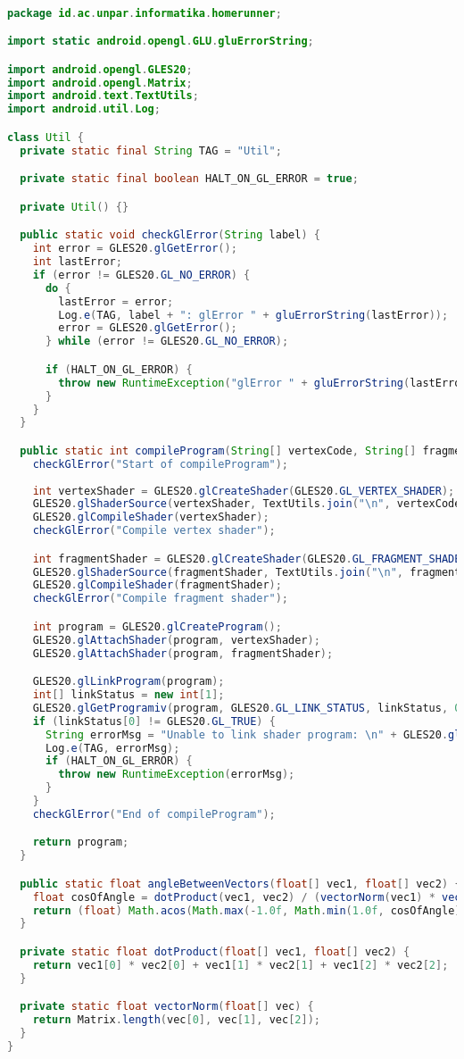 \begin{lstlisting}[language=Java,caption=Util.java]

package id.ac.unpar.informatika.homerunner;

import static android.opengl.GLU.gluErrorString;

import android.opengl.GLES20;
import android.opengl.Matrix;
import android.text.TextUtils;
import android.util.Log;

class Util {
  private static final String TAG = "Util";

  private static final boolean HALT_ON_GL_ERROR = true;

  private Util() {}

  public static void checkGlError(String label) {
    int error = GLES20.glGetError();
    int lastError;
    if (error != GLES20.GL_NO_ERROR) {
      do {
        lastError = error;
        Log.e(TAG, label + ": glError " + gluErrorString(lastError));
        error = GLES20.glGetError();
      } while (error != GLES20.GL_NO_ERROR);

      if (HALT_ON_GL_ERROR) {
        throw new RuntimeException("glError " + gluErrorString(lastError));
      }
    }
  }

  public static int compileProgram(String[] vertexCode, String[] fragmentCode) {
    checkGlError("Start of compileProgram");
    
    int vertexShader = GLES20.glCreateShader(GLES20.GL_VERTEX_SHADER);
    GLES20.glShaderSource(vertexShader, TextUtils.join("\n", vertexCode));
    GLES20.glCompileShader(vertexShader);
    checkGlError("Compile vertex shader");

    int fragmentShader = GLES20.glCreateShader(GLES20.GL_FRAGMENT_SHADER);
    GLES20.glShaderSource(fragmentShader, TextUtils.join("\n", fragmentCode));
    GLES20.glCompileShader(fragmentShader);
    checkGlError("Compile fragment shader");

    int program = GLES20.glCreateProgram();
    GLES20.glAttachShader(program, vertexShader);
    GLES20.glAttachShader(program, fragmentShader);

    GLES20.glLinkProgram(program);
    int[] linkStatus = new int[1];
    GLES20.glGetProgramiv(program, GLES20.GL_LINK_STATUS, linkStatus, 0);
    if (linkStatus[0] != GLES20.GL_TRUE) {
      String errorMsg = "Unable to link shader program: \n" + GLES20.glGetProgramInfoLog(program);
      Log.e(TAG, errorMsg);
      if (HALT_ON_GL_ERROR) {
        throw new RuntimeException(errorMsg);
      }
    }
    checkGlError("End of compileProgram");

    return program;
  }

  public static float angleBetweenVectors(float[] vec1, float[] vec2) {
    float cosOfAngle = dotProduct(vec1, vec2) / (vectorNorm(vec1) * vectorNorm(vec2));
    return (float) Math.acos(Math.max(-1.0f, Math.min(1.0f, cosOfAngle)));
  }

  private static float dotProduct(float[] vec1, float[] vec2) {
    return vec1[0] * vec2[0] + vec1[1] * vec2[1] + vec1[2] * vec2[2];
  }

  private static float vectorNorm(float[] vec) {
    return Matrix.length(vec[0], vec[1], vec[2]);
  }
}
\end{lstlisting}